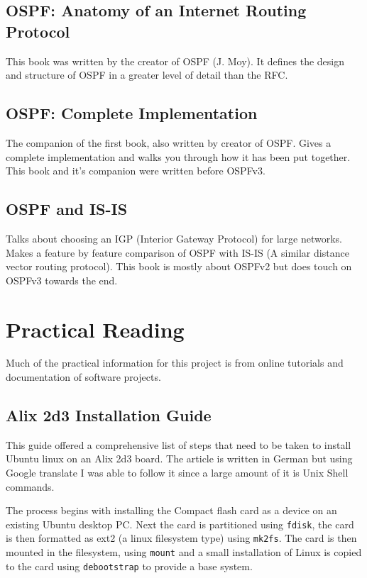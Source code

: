\documentclass[12pt]{report}
\begin{document}
\subsection{OSPF: Anatomy of an Internet Routing Protocol}
 This book was written by the creator of OSPF (J. Moy). It defines the design
 and structure of OSPF in a greater level of detail than the RFC.

\subsection{OSPF: Complete Implementation}
The companion of the first book, also written by creator of OSPF. Gives a
complete implementation and walks you through how it has been put together. This
book and it's companion were written before OSPFv3.

\subsection{OSPF and IS-IS}
Talks about choosing an IGP (Interior Gateway Protocol) for large networks.
Makes a feature by feature comparison of OSPF with IS-IS (A similar distance
vector routing protocol). This book is mostly about OSPFv2 but does touch on
OSPFv3 towards the end.

\section{Practical Reading}		
Much of the practical information for this project is from online tutorials and
documentation of software projects.  

\subsection{Alix 2d3 Installation Guide}
This guide offered a comprehensive list of steps that need to be taken
to install Ubuntu linux on an Alix 2d3 board.  The article is written in
German but using Google translate I was able to follow it since a
large amount of it is Unix Shell commands.  

The process begins with installing the Compact flash card as a device on an
existing Ubuntu desktop PC. Next the card is partitioned using \texttt{fdisk},
the card is then formatted as ext2 (a linux filesystem type) using
\texttt{mk2fs}. The card is then mounted in the filesystem, using \texttt{mount}
and a small installation of Linux is copied to the card using
\texttt{debootstrap} to provide a base system.  
\end{document}
